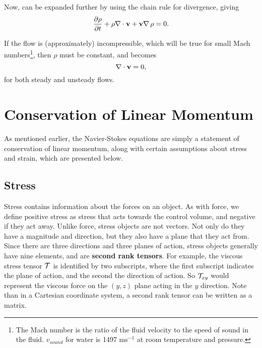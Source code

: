 Now,  can be expanded further by using the chain rule for divergence, giving
\begin{equation}\label{eq:expandedMass}
\pder{1}{\rho}{t} + \rho\Div{\Vector{v}} + \Vector{v}\Grad{\rho}=0.
\end{equation}

If the flow is (approximately) incompressible, which will be true for small Mach numbers\footnote{The Mach number is the ratio of the fluid velocity to the speed of sound in the fluid. $v_{sound}$ for water is 1497 ms$^{-1}$ at room temperature and pressure.}, then $\rho$ must be constant, and  becomes 
\begin{equation}\label{eq:consMassIncomp}
\nabla\cdot\mathbf{v} = 0,
\end{equation}
for both steady and unsteady flows.

\section{Conservation of Linear Momentum} 

As mentioned earlier, the Navier-Stokes equations are simply a statement of conservation of linear momentum, along with certain assumptions about stress  and strain, which are presented below. 
\subsection{Stress}

Stress contains information about the forces on an object. As with force, we define positive stress as stress that acts towards the control volume, and negative if they act away. Unlike force, stress objects are not vectors. Not only do they have a magnitude and direction, but they also have a plane that they act from. Since there are three directions and three planes of action, stress objects generally have nine elements, and are {\bf second rank tensors}. For example, the viscous stress tensor $\mathcal{T}$ is identified by two subscripts, where the first subscript indicates the plane of action, and the second the direction of action. So $\mathcal{T}_{xy}$ would represent the viscous force on the $(y,z)$ plane acting in the $y$ direction. Note than in a Cartesian coordinate system, a second rank tensor can be written as a matrix. 

